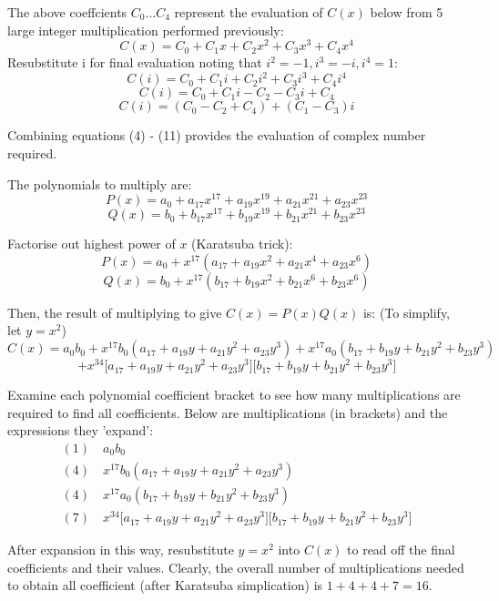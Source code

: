 \documentclass[11pt, a4paper]{article}
\begin{document}
{{{The above coeffcients $C_0 \dots C_4$ represent the evaluation of $C(x)$ below from 5 large integer multiplication performed previously:
\[ C(x) = C_0 + C_1x + C_2x^2 + C_3x^3 + C_4x^4\]
Resubstitute i for final evaluation noting that $i^2 = -1, i^3 = -i, i^4 = 1$:
\[ C(i) = C_0 + C_1i + C_2i^2 + C_3i^3 + C_4i^4\]
\[ C(i) = C_0 + C_1i - C_2 - C_3i + C_4\]
\begin{equation}
 C(i) = (C_0 - C_2 + C_4) + (C_1 - C_3)i
\end{equation}

Combining equations (4) - (11) provides the evaluation of complex number required.


The polynomials to multiply are:
\[P(x) = a_0 + a_{17}x^{17} + a_{19}x^{19} + a_{21}x^{21} + a_{23}x^{23} \]
\[Q(x) = b_0 + b_{17}x^{17} + b_{19}x^{19} + b_{21}x^{21} + b_{23}x^{23} \]

Factorise out highest power of $x$ (Karatsuba trick):
\[P(x) = a_0 + x^{17}(a_{17} + a_{19}x^{2} + a_{21}x^{4} + a_{23}x^{6})\]
\[Q(x) = b_0 + x^{17}(b_{17} + b_{19}x^{2} + b_{21}x^{6} + b_{23}x^{6}) \]

Then, the result of multiplying to give $C(x) = P(x)Q(x)$ is:
(To simplify, let $y = x^2$)
\[C(x) = a_0b_0 + x^{17}b_0(a_{17} + a_{19}y + a_{21}y^{2} + a_{23}y^{3}) + x^{17}a_0(b_{17} + b_{19}y + b_{21}y^{2} + b_{23}y^{3})\]
\[+ x^{34}\big[a_{17} + a_{19}y + a_{21}y^{2} + a_{23}y^{3}\big]\big[b_{17} + b_{19}y + b_{21}y^{2} + b_{23}y^{3}\big] \]

Examine each polynomial coefficient bracket to see how many multiplications are required to find all coefficients. Below are multiplications (in brackets) and the expressions they 'expand':
\begin{align}
 (1) \quad a_0b_0 \\ (4) \quad x^{17}b_0(a_{17} + a_{19}y + a_{21}y^{2} + a_{23}y^{3})\\ 
 (4) \quad x^{17}a_0(b_{17} + b_{19}y + b_{21}y^{2} + b_{23}y^{3})\\ 
 (7) \quad x^{34}\big[a_{17} + a_{19}y + a_{21}y^{2} + a_{23}y^{3}\big]\big[b_{17} + b_{19}y + b_{21}y^{2} + b_{23}y^{3}\big]
\end{align}

After expansion in this way, resubstitute $y = x^2$ into $C(x)$ to read off the final coefficients and their values.
Clearly, the overall number of multiplications needed to obtain all coefficient (after Karatsuba simplication) is $1 + 4 + 4 + 7 = 16$.


}}}
\end{document}
